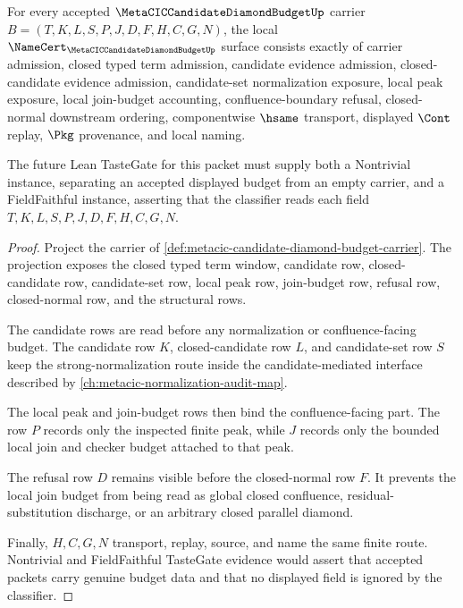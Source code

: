 \begin{theorem}
\label{thm:metacic-candidate-diamond-budget-obligations}
For every accepted $\MetaCICCandidateDiamondBudgetUp$ carrier $B=(T,K,L,S,P,J,D,F,H,C,G,N)$, the local $\NameCert_{\MetaCICCandidateDiamondBudgetUp}$ surface consists exactly of carrier admission, closed typed term admission, candidate evidence admission, closed-candidate evidence admission, candidate-set normalization exposure, local peak exposure, local join-budget accounting, confluence-boundary refusal, closed-normal downstream ordering, componentwise $\hsame$ transport, displayed $\Cont$ replay, $\Pkg$ provenance, and local naming.

The future Lean TasteGate for this packet must supply both a Nontrivial instance, separating an accepted displayed budget from an empty carrier, and a FieldFaithful instance, asserting that the classifier reads each field $T,K,L,S,P,J,D,F,H,C,G,N$.
\end{theorem}
\begin{proof}
Project the carrier of \autoref{def:metacic-candidate-diamond-budget-carrier}. The projection exposes the closed typed term window, candidate row, closed-candidate row, candidate-set row, local peak row, join-budget row, refusal row, closed-normal row, and the structural rows.

The candidate rows are read before any normalization or confluence-facing budget. The candidate row $K$, closed-candidate row $L$, and candidate-set row $S$ keep the strong-normalization route inside the candidate-mediated interface described by \autoref{ch:metacic-normalization-audit-map}.

The local peak and join-budget rows then bind the confluence-facing part. The row $P$ records only the inspected finite peak, while $J$ records only the bounded local join and checker budget attached to that peak.

The refusal row $D$ remains visible before the closed-normal row $F$. It prevents the local join budget from being read as global closed confluence, residual-substitution discharge, or an arbitrary closed parallel diamond.

Finally, $H,C,G,N$ transport, replay, source, and name the same finite route. Nontrivial and FieldFaithful TasteGate evidence would assert that accepted packets carry genuine budget data and that no displayed field is ignored by the classifier.
\end{proof}

